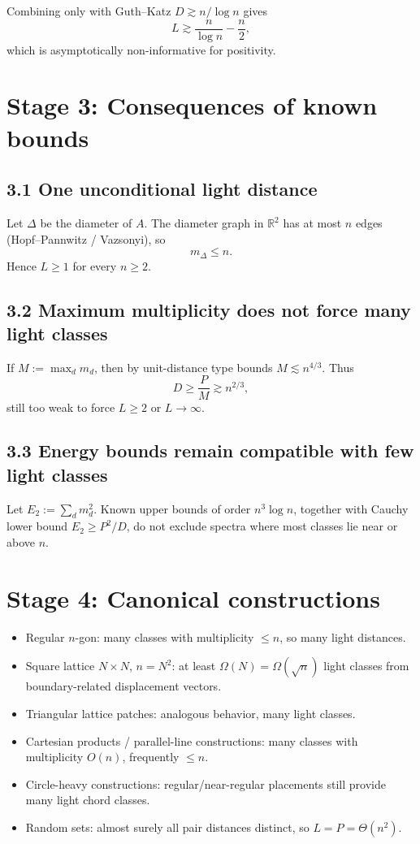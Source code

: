 \documentclass[11pt]{article}
\begin{document}
Combining only with Guth--Katz \(D\gtrsim n/\log n\) gives
\[
L\gtrsim \frac{n}{\log n}-\frac n2,
\]
which is asymptotically non-informative for positivity.

\section*{Stage 3: Consequences of known bounds}

\subsection*{3.1 One unconditional light distance}
Let \(\Delta\) be the diameter of \(A\). The diameter graph in \(\mathbb R^2\) has at most \(n\) edges (Hopf--Pannwitz / Vazsonyi), so
\[
m_\Delta\le n.
\]
Hence \(L\ge 1\) for every \(n\ge 2\).

\subsection*{3.2 Maximum multiplicity does not force many light classes}
If \(M:=\max_d m_d\), then by unit-distance type bounds \(M\lesssim n^{4/3}\). Thus
\[
D\ge \frac{P}{M}\gtrsim n^{2/3},
\]
still too weak to force \(L\ge 2\) or \(L\to\infty\).

\subsection*{3.3 Energy bounds remain compatible with few light classes}
Let \(E_2:=\sum_d m_d^2\). Known upper bounds of order \(n^3\log n\), together with Cauchy lower bound \(E_2\ge P^2/D\), do not exclude spectra where most classes lie near or above \(n\).

\section*{Stage 4: Canonical constructions}

\begin{itemize}
  \item Regular \(n\)-gon: many classes with multiplicity \(\le n\), so many light distances.
  \item Square lattice \(N\times N\), \(n=N^2\): at least \(\Omega(N)=\Omega(\sqrt n)\) light classes from boundary-related displacement vectors.
  \item Triangular lattice patches: analogous behavior, many light classes.
  \item Cartesian products / parallel-line constructions: many classes with multiplicity \(O(n)\), frequently \(\le n\).
  \item Circle-heavy constructions: regular/near-regular placements still provide many light chord classes.
  \item Random sets: almost surely all pair distances distinct, so \(L=P=\Theta(n^2)\).
\end{itemize}
\end{document}
